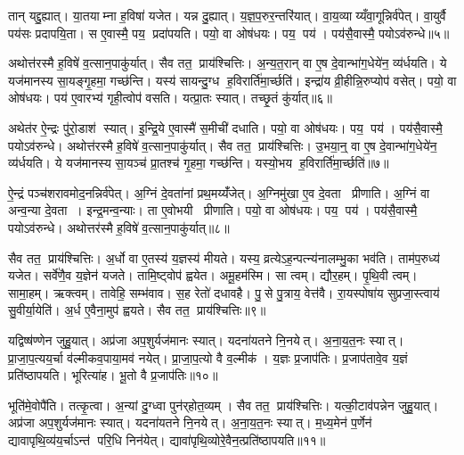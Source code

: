 तान् यद्दु॒ह्यात्। या॒तयाम्ना ह॒विषा॑ यजेत। यन्न दु॒ह्यात्। य॒ज्ञ॒प॒रुर॒न्तरि॑यात्। वा॒य॒व्याय्यँवा॒गून्निर्व॑पेत्। वा॒युर्वै पय॑सः प्रदापयि॒ता। स ए॒वास्मै॒ पय॒ प्रदा॑पयति। पयो॒ वा ओष॑धयः। पय॒ पय॑। पय॑सै॒वास्मै॒ पयोऽव॑रुन्धे॥५॥

अथोत्त॑रस्मै ह॒विषे॑ व॒त्सान॒पाकु॑र्यात्। सैव तत॒ प्राय॑श्चित्तिः। अ॒न्य॒त॒रान् वा ए॒ष दे॒वान्भा॑ग॒धेये॑न॒ व्य॑र्धयति। ये यज॑मानस्य सा॒यङ्गृ॒हमा॒ गच्छ॑न्ति। यस्य॑ सायन्दु॒ग्ध ह॒विरार्ति॑मा॒र्च्छति॑। इन्द्रा॑य व्री॒हीन्नि॒रुप्योप॑ वसेत्। पयो॒ वा ओष॑धयः। पय॑ ए॒वारभ्य॑ गृही॒त्वोप॑ वसति। यत्प्रा॒तः स्यात्। तच्छृ॒तं कु॑र्यात्॥६॥

अथेत॑र ऐ॒न्द्रः पु॑रो॒डाश॑ स्यात्। इ॒न्द्रि॒ये ए॒वास्मै॑ स॒मीची॑ दधाति। पयो॒ वा ओष॑धयः। पय॒ पय॑। पय॑सै॒वास्मै॒ पयोऽव॑रुन्धे। अथोत्त॑रस्मै ह॒विषे॑ व॒त्सान॒पाकु॑र्यात्। सैव तत॒ प्राय॑श्चित्तिः। उ॒भया॒न्॒ वा ए॒ष दे॒वान्भा॑ग॒धेये॑न॒ व्य॑र्धयति। ये यज॑मानस्य सा॒यञ्च॑ प्रा॒तश्च॑ गृ॒हमा॒ गच्छ॑न्ति। यस्यो॒भय ह॒विरार्ति॑मा॒र्च्छति॑॥७॥

ऐ॒न्द्रं पञ्च॑शरावमोद॒नन्निर्व॑पेत्। अ॒ग्निं दे॒वता॑नां प्रथ॒मय्यँ॑जेत्। अ॒ग्निमु॑खा ए॒व दे॒वता प्रीणाति। अ॒ग्निं वा अन्व॒न्या दे॒वता। इन्द्र॒मन्व॒न्याः। ता ए॒वोभयी प्रीणाति। पयो॒ वा ओष॑धयः। पय॒ पय॑। पय॑सै॒वास्मै॒ पयोऽव॑रुन्धे। अथोत्तर॑स्मै ह॒विषे॑ व॒त्सान॒पाकु॑र्यात्॥८॥

सैव तत॒ प्राय॑श्चित्तिः। अ॒र्धो वा ए॒तस्य॑ य॒ज्ञस्य॑ मीयते। यस्य॒ व्रत्येऽह॒न्पत्न्य॑नालम्भु॒का भव॑ति। ताम॑प॒रुध्य॑ यजेत। सर्वे॑णै॒व य॒ज्ञेन॑ यजते। तामि॒ष्ट्वोप॑ ह्वयेत। अमू॒हम॑स्मि। सा त्वम्। द्यौर॒हम्। पृ॒थि॒वी त्वम्। सामा॒हम्। ऋक्त्वम्। तावेहि॒ सम्भ॑वाव। स॒ह रेतो॑ दधावहै। पु॒से पु॒त्राय॒ वेत्त॑वै। रा॒यस्पोषा॑य सुप्रजा॒स्त्वाय॑ सु॒वीर्या॒येति॑। अ॒र्ध ए॒वैना॒मुप॑ ह्वयते। सैव तत॒ प्राय॑श्चित्तिः॥९॥\anuvakamend[द॒धा॒ति॒ य॒ज्ञ उ॑त॒ एक॒न्धय॑न्ति रुन्धे कुर्यादा॒र्च्छत्य॒पाकु॑र्यात्पृथि॒वी त्वम॒ष्टौ च॑ (सर्वा॒न्॒ वि वै यदि॑ परस्त॒रामोष॑धीरन्यत॒रानु॒भया॑न॒र्धो वै ॥ )]

यद्विष्ष॑ण्णेन जुहु॒यात्। अप्र॑जा अप॒शुर्यज॑मानः स्यात्। यदना॑यतने नि॒नयेत्। अ॒ना॒य॒त॒नः स्यात्। प्रा॒जा॒प॒त्यय॒र्चा व॑ल्मीकव॒पाया॒मव॑ नयेत्। प्रा॒जा॒प॒त्यो वै व॒ल्मीक॑। य॒ज्ञः प्र॒जाप॑तिः। प्र॒जाप॑तावे॒व य॒ज्ञं प्रति॑ष्ठापयति। भूरित्या॑ह। भू॒तो वै प्र॒जाप॑तिः॥१०॥

भूति॑मे॒वोपै॑ति। तत्कृ॒त्वा। अ॒न्यां दु॒ग्ध्वा पुन॑र्‌होत॒व्यम्। सैव तत॒ प्राय॑श्चित्तिः। यत्की॒टाव॑पन्नेन जुहु॒यात्। अप्र॑जा अप॒शुर्यज॑मानः स्यात्। यदना॑यतने नि॒नयेत्। अ॒ना॒य॒त॒नः स्यात्। म॒ध्य॒मेन॑ प॒र्णेन॑ द्यावापृथि॒व्य॑य॒र्चाऽन्त॑ परि॒धि निन॑येत्। द्यावा॑पृथि॒व्योरे॒वैन॒त्प्रति॑ष्ठापयति॥११॥

